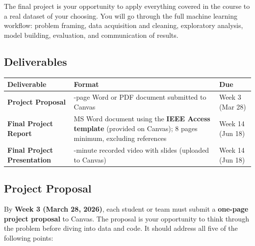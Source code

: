 \documentclass[
  10pt,
]{article}
\begin{document}
The final project is your opportunity to apply everything covered in the
course to a real dataset of your choosing. You will go through the full
machine learning workflow: problem framing, data acquisition and
cleaning, exploratory analysis, model building, evaluation, and
communication of results.

\subsection{Deliverables}\label{deliverables}

\begin{longtable}[]{@{}
  >{\raggedright\arraybackslash}p{}
  >{\raggedright\arraybackslash}p{}
  >{\raggedright\arraybackslash}p{}@{}}
\toprule\noalign{}
\begin{minipage}[b]{\linewidth}\raggedright
Deliverable
\end{minipage} & \begin{minipage}[b]{\linewidth}\raggedright
Format
\end{minipage} & \begin{minipage}[b]{\linewidth}\raggedright
Due
\end{minipage} \\
\midrule\noalign{}
\endhead
\bottomrule\noalign{}
\endlastfoot
\textbf{Project Proposal} & 1-page Word or PDF document submitted to
Canvas & Week 3 (Mar 28) \\
\textbf{Final Project Report} & MS Word document using the \textbf{IEEE
Access template} (provided on Canvas); 8 pages minimum, excluding
references & Week 14 (Jun 18) \\
\textbf{Final Project Presentation} & 15-minute recorded video with
slides (uploaded to Canvas) & Week 14 (Jun 18) \\
\end{longtable}

\subsection{Project Proposal}\label{project-proposal}

By \textbf{Week 3 (March 28, 2026)}, each student or team must submit a
\textbf{one-page project proposal} to Canvas. The proposal is your
opportunity to think through the problem before diving into data and
code. It should address all five of the following points:
\end{document}
